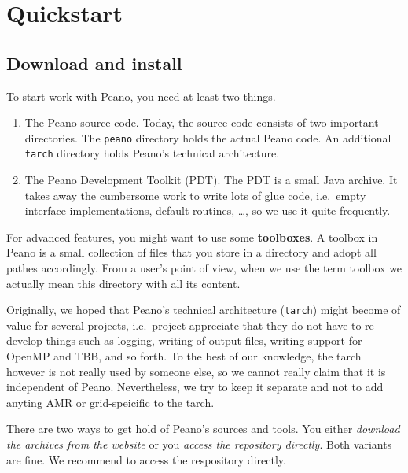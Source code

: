 \chapter{Quickstart}
\label{chapter:quickstart}


\section{Download and install}

To start work with Peano, you need at least two things.

\begin{enumerate}
  \item The Peano source code. Today, the source code consists of two important
  directories. The \texttt{peano} directory holds the actual Peano code. An
  additional \texttt{tarch} directory holds Peano's technical architecture.
  \item The Peano Development Toolkit (PDT). The PDT is a small Java archive. It
  takes away the cumbersome work to write lots of glue code, i.e.~empty
  interface implementations, default routines, \ldots, so we use it quite
  frequently.
\end{enumerate}

\noindent
For advanced features, you might want to use some {\bf toolboxes}.
A toolbox in Peano is a small collection of files that you store in a directory
and adopt all pathes accordingly.
From a user's point of view, when we use the term toolbox we actually mean this
directory with all its content.



\begin{history}
Originally, we hoped that Peano's technical architecture (\texttt{tarch}) might
become of value for several projects, i.e.~project appreciate that they do not
have to re-develop things such as logging, writing of output files, writing
support for OpenMP and TBB, and so forth.
To the best of our knowledge, the tarch however is not really used by someone
else, so we cannot really claim that it is independent of Peano.
Nevertheless, we try to keep it separate and not to add anyting AMR or
grid-speicific to the tarch.
\end{history}

There are two ways to get hold of Peano's sources and tools. You either {\em
download the archives from the website} or you {\em access the repository
directly}.
Both variants are fine.
We recommend to access the respository directly.


